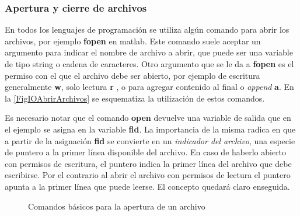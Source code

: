\subsubsection{Apertura y cierre de archivos}


En todos los lenguajes de programación se utiliza algún comando
para abrir los archivos, por ejemplo \textbf{fopen} en matlab.
Este comando suele aceptar un argumento para indicar el
nombre de archivo a abrir, que puede ser una variable 
de tipo string o cadena de caracteres. Otro argumento
que se le da a \textbf{fopen} es el permiso con el 
que el archivo debe ser abierto, por ejemplo
de escritura generalmente \textbf{w}, solo lectura \textbf{r}
, o para agregar contenido al final o \emph{append} \textbf{a}. 
En la  \autoref{FigIOAbrirArchivos} se esquematiza
la utilización de estos comandos. 

Es necesario notar que el comando \textbf{open} devuelve
una variable de salida que en el ejemplo se asigna 
en la variable \textbf{fid}. 
La importancia de la misma radica en que a partir
de la asignación \textbf{fid} se convierte en 
un \emph{indicador del archivo}, una especie de puntero
a la primer línea disponible del archivo. En caso
de haberlo abierto con permisos de escritura, 
el puntero indica la primer línea del 
archivo que debe escribirse. Por el contrario
al abrir el archivo con permisos de lectura
el puntero apunta a la primer
línea que puede leerse. El concepto quedará 
claro enseguida. 

\begin{figure}
  \caption{Comandos básicos para la apertura de un archivo\label{FigIOAbrirArchivos}}
\end{figure}

\mode*

